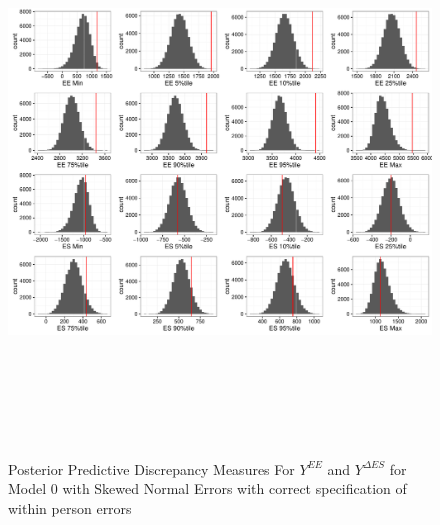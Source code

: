 \documentclass[11pt]{article}\usepackage[]{graphicx}\usepackage[]{color}
\begin{document}
\begin{figure}
 \centering
 \includegraphics[width=17cm,height=15cm]{manual_figure/wpydiag0s.pdf}
 \caption{Posterior Predictive Discrepancy Measures For $Y^{EE}$ and $Y^{\Delta ES}$ for Model 0 with Skewed Normal Errors with correct specification of within person errors}
 \label{ydiag0swp}
 \end{figure}
\end{document}
